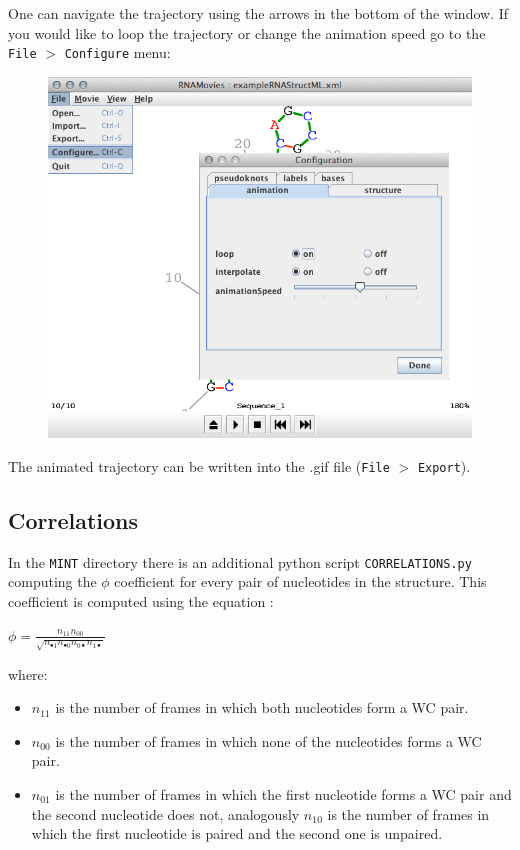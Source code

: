 \documentclass[12pt]{article}
\begin{document}
One can navigate the trajectory using the arrows in the bottom of the window. If you would like to loop the trajectory or change the animation speed go to the \texttt{File} $>$ \texttt{Configure} menu: 
\begin{figure}[h!]
\centering
\includegraphics[scale=0.4]{./pictures/RNAmovies_3.png}
\end{figure}
\newpage
The animated trajectory can be written into the .gif file  (\texttt{File} $>$ \texttt{Export}).

\subsection{Correlations}\label{CorrelationsParagraph}
In the \texttt{MINT} directory there is an additional python script \texttt{CORRELATIONS.py} computing the $\phi$ coefficient for every pair of nucleotides in the structure. This coefficient is computed using the equation \cite{Everitt1977}:
\begin{center}
\begin{large}
$ \phi = \frac{n_{11}n_{00}}{\sqrt{n_{\bullet1}n_{\bullet0} n_{0\bullet}n_{1\bullet}}}$
\end{large}
\end{center}

where:
\begin{itemize}
\item $n_{11}$ is the number of frames in which both nucleotides form a WC pair.
\item $n_{00}$ is the number of frames in which none of the nucleotides forms a WC pair.
\item $n_{01}$ is the number of frames in which the first nucleotide forms a WC pair and the second nucleotide does not, analogously $n_{10}$ is the number of frames in which the first nucleotide is paired and the second one is unpaired.
\end{itemize}
\end{document}
